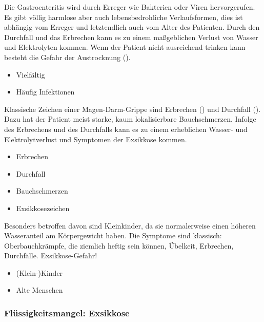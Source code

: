{
{%
Die Gastroenteritis wird durch Erreger wie Bakterien oder
Viren hervorgerufen. Es gibt völlig harmlose aber auch
lebensbedrohliche Verlaufsformen, dies ist abhängig vom
Erreger und letztendlich auch vom Alter des Patienten. Durch
den Durchfall und das Erbrechen kann es zu einem maßgeblichen
Verlust von Wasser und Elektrolyten kommen. Wenn der Patient
nicht ausreichend trinken kann besteht die Gefahr der
Austrocknung (). 
}{
\begin{itemize}
  \item Vielfältig
  \item Häufig Infektionen
\end{itemize}
}{}{}{}


{
Klassische Zeichen einer Magen-Darm-Grippe sind Erbrechen
() und Durchfall (). Dazu hat
der Patient meist starke, kaum lokalisierbare
Bauchschmerzen. Infolge des 
Erbrechens und des Durchfalls kann es zu einem erheblichen 
Wasser- und Elektrolytverlust und Symptomen der Exsikkose
 kommen. 

}{
\begin{itemize}
    \item Erbrechen 
    \item Durchfall 
    \item Bauchschmerzen
    \item Exsikkosezeichen
\end{itemize}
}{}{}{}

{%
Besonders betroffen davon sind Kleinkinder, da sie
normalerweise einen höheren Wasseranteil am Körpergewicht
haben.  Die Symptome sind klassisch: Oberbauchkrämpfe,
die ziemlich heftig sein können, Übelkeit, Erbrechen, Durchfälle.
Exsikkose-Gefahr! 
}{
\begin{itemize}
    \item (Klein-)Kinder
    \item Alte Menschen
\end{itemize}
}{}{}{}






\subsubsection{Flüssigkeitsmangel: Exsikkose}

}
